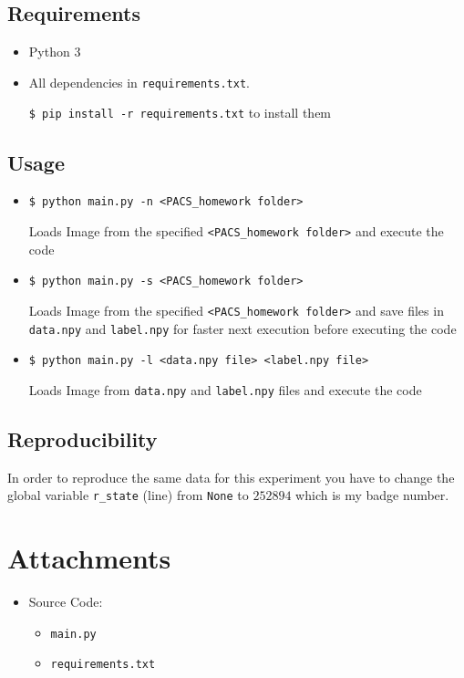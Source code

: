 \documentclass[a4paper, 11pt]{article}
\begin{document}
	\subsection{Requirements}
	\begin{itemize}
		\item Python 3
		\item All dependencies in \texttt{requirements.txt}.
		
		\texttt{\$ pip install -r requirements.txt} to install them
	\end{itemize}
	\subsection{Usage}
	\begin{itemize}
		\item \texttt{\$ python main.py -n <PACS\_homework folder>}
		
		Loads Image from the specified \texttt{<PACS\_homework folder>} and execute the code
		
		\item \texttt{\$ python main.py -s <PACS\_homework folder>}
		
		Loads Image from the specified \texttt{<PACS\_homework folder>} and save files in \texttt{data.npy} and \texttt{label.npy} for faster next execution before executing the code
		
		\item \texttt{\$ python main.py -l <data.npy file> <label.npy file> }
		
		Loads Image from \texttt{data.npy} and \texttt{label.npy} files and execute the code
	
	\end{itemize}
	\subsection{Reproducibility}
	In order to reproduce the same data for this experiment you have to change the global variable \texttt{r\_state} (line) from \texttt{None} to $252894$ which is my badge number.

	\section*{Attachments}
	\begin{itemize}
		\item Source Code:
		\begin{itemize}
			\item \texttt{main.py}
			\item \texttt{requirements.txt}
		\end{itemize}
	\end{itemize}
	
\end{document}
